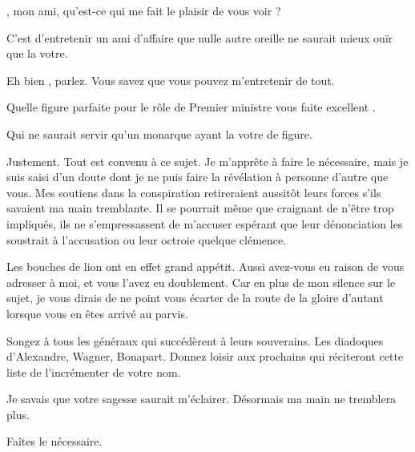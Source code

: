 \begin{drama}
  \elenaspeaks \general, mon ami, qu’est-ce qui me fait le plaisir de vous voir ?

  \generalspeaks C’est d’entretenir un ami d’affaire que nulle autre oreille ne saurait mieux ouïr que la votre.


  \exit{\alexas}

  \elenaspeaks Eh bien \general, parlez. Vous savez que vous pouvez m’entretenir de tout.

  \generalspeaks Quelle figure parfaite pour le rôle de Premier ministre vous faite excellent \elena.

  \elenaspeaks Qui ne saurait servir qu’un monarque ayant la votre de figure.

  \generalspeaks Justement. Tout est convenu à ce sujet. Je m’apprête à faire le nécessaire, mais je suis saisi d’un doute dont je ne puis faire la révélation à personne d’autre que vous. Mes soutiens dans la conspiration retireraient aussitôt leurs forces s’ils savaient ma main tremblante. Il se pourrait même que craignant de n’être trop impliqués, ils ne s’empressassent  de m’accuser espérant que leur dénonciation les soustrait à l’accusation ou leur octroie quelque clémence.

  \elenaspeaks Les bouches de lion ont en effet grand appétit. Aussi avez-vous eu raison de vous adresser à moi, et vous l’avez eu doublement. Car en plus de mon silence sur le sujet, je vous dirais de ne point vous écarter de la route de la gloire d’autant lorsque vous en êtes arrivé au parvis.

  Songez à tous les généraux qui succédèrent à leurs souverains. Les diadoques d’Alexandre, Wagner, Bonapart. Donnez loisir aux prochains qui réciteront cette liste de l’incrémenter de votre nom.

  \generalspeaks Je savais que votre sagesse saurait m’éclairer. Désormais ma main ne tremblera plus.

  \elenaspeaks Faîtes le nécessaire.
\end{drama}

\scene

\StageDirII{\roi, \ela, \kingsgards, \general, \conspirateurs}



